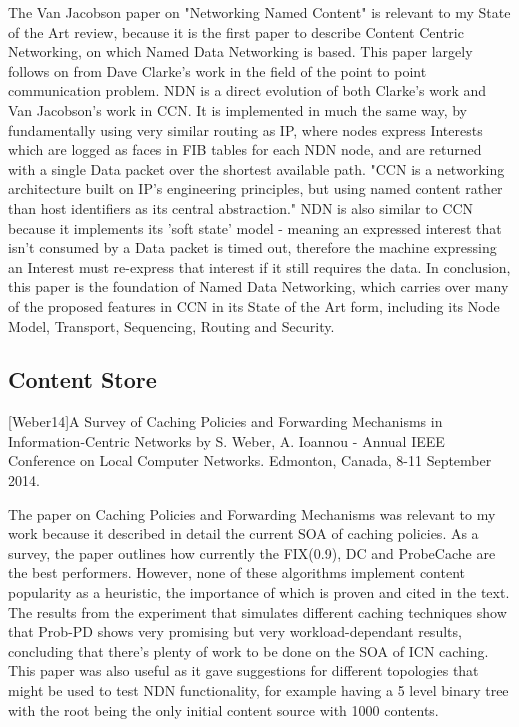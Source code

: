 The Van Jacobson paper on "Networking Named Content" is relevant to my State of the Art review, because it is the first paper to describe Content Centric Networking, on which Named Data Networking is based. This paper largely follows on from Dave Clarke's work in the field of the point to point communication problem. NDN is a direct evolution of both Clarke's work and Van Jacobson's work in CCN. It is implemented in much the same way, by fundamentally using very similar routing as IP, where nodes express Interests which are logged as faces in FIB tables for each NDN node, and are returned with a single Data packet over the shortest available path. "CCN is a networking architecture built on IP's engineering principles, but using named content rather than host identifiers as its central abstraction." NDN is also similar to CCN because it implements its 'soft state' model - meaning an expressed interest that isn't consumed by  a Data packet is timed out, therefore the machine expressing an Interest must re-express that interest if it still requires the data. In conclusion, this paper is the foundation of Named Data Networking, which carries over many of the proposed features in CCN in its State of the Art form, including its Node Model, Transport, Sequencing, Routing and Security.


\subsection{Content Store}
[Weber14]A Survey of Caching Policies and Forwarding Mechanisms in Information-Centric Networks by S. Weber, A. Ioannou -  Annual IEEE Conference on Local Computer Networks. Edmonton, Canada, 8-11 September 2014.

The paper on Caching Policies and Forwarding Mechanisms was relevant to my work because it described in detail the current SOA of caching policies. As a survey, the paper outlines how currently the FIX(0.9), DC and ProbeCache are the best performers. However, none of these algorithms implement content popularity as a heuristic, the importance of which is proven and cited in the text. The results from the experiment that simulates different caching techniques show that Prob-PD shows very promising but very workload-dependant results, concluding that there’s plenty of work to be done on the SOA of ICN caching. This paper was also useful as it gave suggestions for different topologies that might be used to test NDN functionality, for example having a 5 level binary tree with the root being the only initial content source with 1000 contents. 
\\


